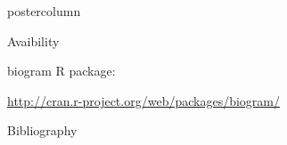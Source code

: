 \documentclass[final]{beamer}\usepackage[]{graphicx}\usepackage[]{color}
\begin{document}
\begin{frame}
\begin{columns}
\begin{column}{.52\textwidth}
\begin{beamercolorbox}[center,wd=\textwidth]{postercolumn}
\begin{minipage}[T]{.95\textwidth}
{        \begin{block}{Avaibility}
        \footnotesize{
      
      biogram R package: 
      
      \url{http://cran.r-project.org/web/packages/biogram/}
        }
    \end{block}
    \vfill 
     
     
    \begin{block}{Bibliography}
    \tiny{
      
      
    }
    \end{block}
    \vfill
            }
        \end{minipage}
      \end{beamercolorbox}
    \end{column}
  \end{columns}  
\end{frame}
\end{document}
